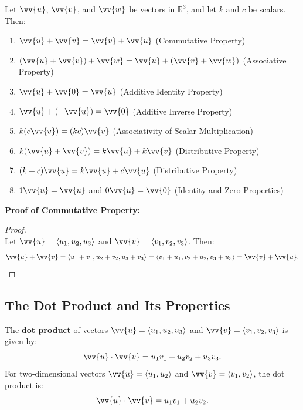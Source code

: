 \documentclass{article}
\begin{document}
\begin{theorembox}
    Let \(\vv{u}\), \(\vv{v}\), and \(\vv{w}\) be vectors in \(\mathbb{R}^3\), and let \(k\) and \(c\) be scalars. Then:
    \begin{enumerate}
        \item \(\vv{u} + \vv{v} = \vv{v} + \vv{u}\) \quad (Commutative Property)
        \item \((\vv{u} + \vv{v}) + \vv{w} = \vv{u} + (\vv{v} + \vv{w})\) \quad (Associative Property)
        \item \(\vv{u} + \vv{0} = \vv{u}\) \quad (Additive Identity Property)
        \item \(\vv{u} + (-\vv{u}) = \vv{0}\) \quad (Additive Inverse Property)
        \item \(k(c\vv{v}) = (kc)\vv{v}\) \quad (Associativity of Scalar Multiplication)
        \item \(k(\vv{u} + \vv{v}) = k\vv{u} + k\vv{v}\) \quad (Distributive Property)
        \item \((k + c)\vv{u} = k\vv{u} + c\vv{u}\) \quad (Distributive Property)
        \item \(1\vv{u} = \vv{u}\) and \(0\vv{u} = \vv{0}\) \quad (Identity and Zero Properties)
    \end{enumerate}
\end{theorembox}

\begin{proofbox}
    \textbf{Proof of Commutative Property:}
    \begin{proof}
    \leavevmode\\
    Let \(\vv{u} = \langle u_1, u_2, u_3 \rangle\) and \(\vv{v} = \langle v_1, v_2, v_3 \rangle\). Then:
    \[
    \vv{u} + \vv{v} = \langle u_1 + v_1, u_2 + v_2, u_3 + v_3 \rangle = \langle v_1 + u_1, v_2 + u_2, v_3 + u_3 \rangle = \vv{v} + \vv{u}.
    \]
    \end{proof}
\end{proofbox}

\subsection*{The Dot Product and Its Properties}

The \textbf{dot product} of vectors \(\vv{u} = \langle u_1, u_2, u_3 \rangle\) and \(\vv{v} = \langle v_1, v_2, v_3 \rangle\) is given by:
\[
\vv{u} \cdot \vv{v} = u_1 v_1 + u_2 v_2 + u_3 v_3.
\]
For two-dimensional vectors \(\vv{u} = \langle u_1, u_2 \rangle\) and \(\vv{v} = \langle v_1, v_2 \rangle\), the dot product is:
\[
\vv{u} \cdot \vv{v} = u_1 v_1 + u_2 v_2.
\]
\end{document}
